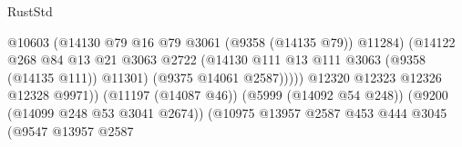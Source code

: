 \begin{lexlean}{RustStd}
\begin{coremodule}
                                                          @10603
                                                          (@14130
                                                            @79
                                                            @16
                                                            @79
                                                            @3061
                                                            (@9358 (@14135 @79))
                                                            @11284)
                                                          (@14122
                                                            @268
                                                            @84
                                                            @13
                                                            @21
                                                            @3063
                                                            @2722
                                                            (@14130
                                                              @111
                                                              @13
                                                              @111
                                                              @3063
                                                              (@9358 (@14135 @111))
                                                              @11301)
                                                            (@9375 @14061 @2587)))))
                                                    @12320
                                                    @12323
                                                    @12326
                                                    @12328
                                                    @9971))
                                                (@11197 (@14087 @46))
                                                (@5999 (@14092 @54 @248))
                                                (@9200 (@14099 @248 @53 @3041 @2674))
                                                (@10975
                                                  @13957
                                                  @2587
                                                  @453
                                                  @444
                                                  @3045
                                                  (@9547
                                                    @13957
                                                    @2587

\end{coremodule}
\end{lexlean}
